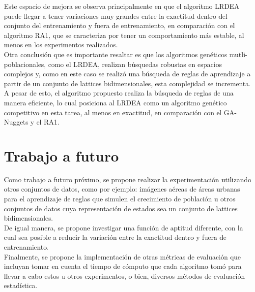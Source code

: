 Este espacio de mejora se observa principalmente en que el algoritmo LRDEA puede llegar a tener variaciones muy grandes entre la exactitud dentro del conjunto del entrenamiento y fuera de entrenamiento, en comparación con el algoritmo RA1, que se caracteriza por tener un comportamiento más estable, al menos en los experimentos realizados.
\\

Otra conclusión que es  importante resaltar es que los algoritmos genéticos mutli-poblacionales, como el LRDEA, realizan búsquedas robustas en espacios complejos y, como en este caso se realizó una búsqueda de reglas de aprendizaje a partir de un conjunto de lattices bidimensionales, esta complejidad se incrementa. A pesar de esto, el algoritmo propuesto realiza la búsqueda de reglas de una manera eficiente, lo cual posiciona al LRDEA como un algoritmo genético competitivo en esta tarea, al menos en exactitud, en comparación con el GA-Nuggets y el RA1.

\section{Trabajo a futuro}

Como trabajo a futuro próximo, se propone realizar la experimentación utilizando otros conjuntos de datos, como por ejemplo: imágenes aéreas de áreas urbanas para el aprendizaje de reglas que simulen el crecimiento de población u otros conjuntos de datos cuya representación de estados sea un conjunto de lattices bidimensionales.
\\

De igual manera, se propone investigar una función de aptitud diferente, con la cual sea posible a reducir la variación entre la exactitud dentro y fuera de entrenamiento.
\\

Finalmente, se propone la implementación de otras métricas de evaluación que incluyan tomar en cuenta el tiempo de cómputo que cada algoritmo tomó para llevar a cabo estos u otros experimentos, o bien, diversos métodos de evaluación estadística.